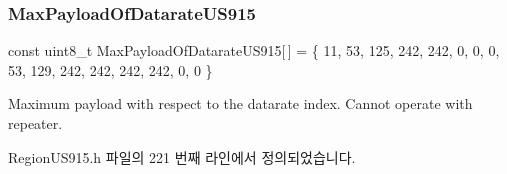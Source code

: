\subsubsection{\texorpdfstring{Max\+Payload\+Of\+Datarate\+U\+S915}{MaxPayloadOfDatarateUS915}}
{\footnotesize\ttfamily const uint8\+\_\+t Max\+Payload\+Of\+Datarate\+U\+S915\mbox{[}$\,$\mbox{]} = \{ 11, 53, 125, 242, 242, 0, 0, 0, 53, 129, 242, 242, 242, 242, 0, 0 \}\hspace{0.3cm}{\ttfamily [static]}}

Maximum payload with respect to the datarate index. Cannot operate with repeater. 

Region\+U\+S915.\+h 파일의 221 번째 라인에서 정의되었습니다.


